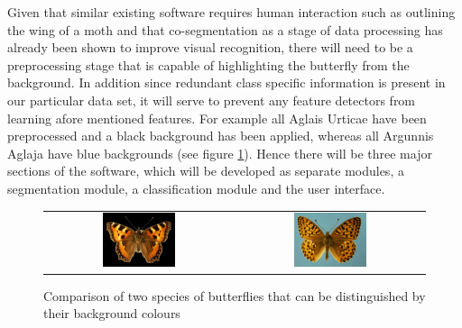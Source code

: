 \documentclass[11pt, titlepage, oneside]{article}
\theoremstyle{plain}
\theoremstyle{definition}
\theoremstyle{remark}
\begin{document}
	\noindent Given that similar existing software requires human interaction such as outlining the wing of a moth\cite{book} and that co-segmentation as a stage of data processing has already been shown to improve visual recognition\cite{vis}, there will need to be a preprocessing stage that is capable of highlighting the butterfly from the background. In addition since redundant class specific information is present in our particular data set, it will serve to prevent any feature detectors from learning afore mentioned features. For example all Aglais Urticae have been preprocessed and a black background has been applied, whereas all Argunnis Aglaja have blue backgrounds (see figure \ref{fig:background}). Hence there will  be three major sections of the software, which will be developed as separate modules, a segmentation module, a classification module and the user interface.
		
		\begin{figure}[H]
			\centering
			\begin{tabular}{cc}
			\includegraphics[width=0.4\textwidth]{Aglais-urticae-02.jpg} &
			\includegraphics[width=0.4\textwidth]{Argynnis-aglaja-02.jpg}
			\end{tabular} 
			\caption{Comparison of two species of butterflies that can be distinguished by their background colours}
			\label{fig:background}
		\end{figure}
	
\end{document}
